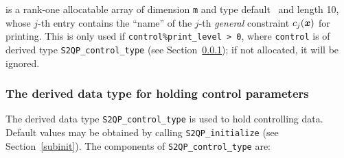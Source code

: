 \documentclass{galahad}
\newcommand{\packagename}{S2QP}
\begin{document}
\begin{description}
 is a rank-one allocatable array of dimension {\tt m} and
type default \character\ and length 10, whose $j$-th entry contains
the ``name'' of the $j$-th {\em general} constraint $c_j({\bm{x}})$ for
printing.  This is only used if {\tt control\%print\_level > 0}, where
{\tt control} is of derived type {\tt \packagename\_control\_type}
(see Section~\ref{typecontrol}); if not allocated, it will be ignored.

\end{description}


\subsubsection{The derived data type for holding control 
 parameters}\label{typecontrol}
The derived data type 
{\tt \packagename\_control\_type} 
is used to hold controlling data. Default values may be obtained by calling 
{\tt \packagename\_initialize}
(see Section~\ref{subinit}). The components of 
{\tt \packagename\_control\_type} 
are:
\end{document}
